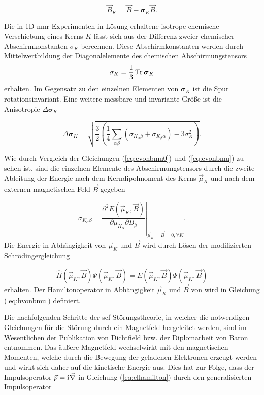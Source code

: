 \begin{equation}
\vec{B}_K=\vec{B}-\boldsymbol{\sigma}_K\vec{B}.
\end{equation}


	 Die in 1D-\ac{nmr}-Experimenten in Lösung erhaltene isotrope chemische Verschiebung eines Kerns $K$ lässt sich aus der Differenz zweier chemischer Abschirmkonstanten $\sigma_K$ berechnen. Diese Abschirmkonstanten werden durch Mittelwertbildung der Diagonalelemente des chemischen Abschirmungstensors 
	\begin{equation}
	  \sigma_K=\frac{1}{3}\operatorname{Tr} \boldsymbol{\sigma}_K
	\end{equation}	 
	 erhalten. Im Gegensatz zu den einzelnen Elementen von $\boldsymbol{\sigma}_K$ ist die Spur rotationsinvariant. Eine weitere messbare und invariante Größe ist die Anisotropie $\Delta\boldsymbol{\sigma}_K$
	 
	 \begin{equation}
	 \Delta\boldsymbol{\sigma}_K=\sqrt{\frac{3}{2}\left(\frac{1}{4}\sum_{\alpha\beta}(\sigma_{K_\alpha\beta}+\sigma_{K_\beta\alpha})-3\sigma_K^2\right)}.
	 \end{equation}
	 
	  Wie durch Vergleich der Gleichungen (\ref{eq:evonbmu0}) und (\ref{eq:evonbmu}) zu sehen ist, sind die einzelnen Elemente des Abschirmungstensors durch die zweite Ableitung der Energie nach dem Kerndipolmoment des Kerns $\vec{\mu}_K$ und nach dem externen magnetischen Feld $\vec{B}$ gegeben
	
	\begin{equation}\label{eq:abschirmugstensor}
	\sigma_{K_\alpha\beta}=\left.\frac{\partial^2 E(\vec{\mu}_K,\vec{B})}{\partial \mu_{K_\alpha}\partial B_\beta}\right|_{\vec{\mu}_K=\vec{B}=0,\forall K}.
	\end{equation}
	Die Energie in Abhängigkeit von $\vec{\mu}_K$ und $\vec{B}$ wird durch Lösen der modifizierten Schrödingergleichung
	
	\begin{equation}
	\hat{H}(\vec{\mu}_K,\vec{B})\Psi(\vec{\mu}_K,\vec{B})=E(\vec{\mu}_K,\vec{B})\Psi(\vec{\mu}_K,\vec{B})
	\end{equation}
	erhalten. Der Hamiltonoperator in Abhängigkeit $\vec{\mu}_K$ und $\vec{B}$ von wird in Gleichung (\ref{eq:hvonbmu}) definiert. 
	 

	\bigskip
	Die nachfolgenden Schritte der \ac{scf}-Störungstheorie, in welcher die notwendigen Gleichungen für die Störung durch ein Magnetfeld hergeleitet werden, sind im Wesentlichen der Publikation von Dichtfield\supercite{ditchfield1974self} bzw. der Diplomarbeit von Baron\supercite{baron1991} entnommen. Das äußere Magnetfeld wechselwirkt mit den magnetischen Momenten, welche durch die Bewegung der geladenen Elektronen erzeugt werden und wirkt sich daher auf die kinetische Energie aus. Dies hat zur Folge, dass der Impulsoperator $\vec{p}=\mathrm{i}\mkern1mu\vec{\nabla}$ in Gleichung (\ref{eq:elhamilton}) durch den generalisierten Impulsoperator
	
